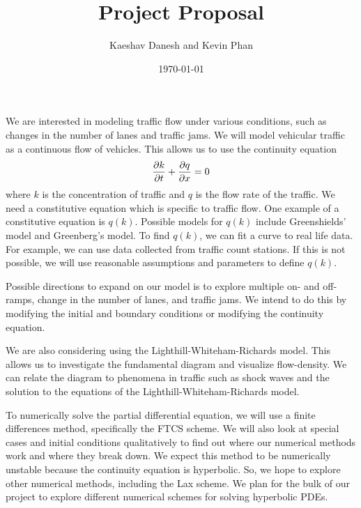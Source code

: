 \documentclass[12pt]{article}
\title{Project Proposal}
\author{Kaeshav Danesh and Kevin Phan}
\date{\today}
\begin{document}
	\maketitle
    We are interested in modeling traffic flow under various conditions, such as changes in the number of lanes and traffic jams. We will model vehicular traffic as a continuous flow of vehicles. This allows us to use the continuity equation 
    \begin{equation}
        \pdv{k}{t} + \pdv{q}{x} = 0
    \end{equation}
    where $k$ is the concentration of traffic and $q$ is the flow rate of the traffic. We need a constitutive equation which is specific to traffic flow. One example of a constitutive equation is $q(k)$. Possible models for $q(k)$ include Greenshields' model and Greenberg's model. To find $q(k)$, we can fit a curve to real life data. For example, we can use data collected from traffic count stations. If this is not possible, we will use reasonable assumptions and parameters to define $q(k)$. 
    
    Possible directions to expand on our model is to explore multiple on- and off-ramps, change in the number of lanes, and traffic jams. We intend to do this by modifying the initial and boundary conditions or modifying the continuity equation. 
    
    We are also considering using the Lighthill-Whiteham-Richards model. This allows us to investigate the fundamental diagram and visualize flow-density. We can relate the diagram to phenomena in traffic such as shock waves and the solution to the equations of the Lighthill-Whiteham-Richards model.

    To numerically solve the partial differential equation, we will use a finite differences method, specifically the FTCS scheme.  We will also look at special cases and initial conditions qualitatively to find out where our numerical methods work and where they break down. We expect this method to be numerically unstable because the continuity equation is hyperbolic. So, we hope to explore other numerical methods, including the Lax scheme. We plan for the bulk of our project to explore different numerical schemes for solving hyperbolic PDEs.
\end{document}
